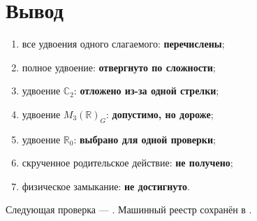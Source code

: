 \section{Вывод}

\begin{protocol}
\begin{enumerate}
 \item все удвоения одного слагаемого: \textbf{перечислены};
 \item полное удвоение: \textbf{отвергнуто по сложности};
 \item удвоение \(\mathbb C_2\): \textbf{отложено из-за одной стрелки};
 \item удвоение \(M_3(\mathbb R)_G\): \textbf{допустимо, но дороже};
 \item удвоение \(\mathbb R_0\): \textbf{выбрано для одной проверки};
 \item скрученное родительское действие: \textbf{не получено};
 \item физическое замыкание: \textbf{не достигнуто}.
\end{enumerate}
\end{protocol}

Следующая проверка --- .
Машинный реестр сохранён в
.